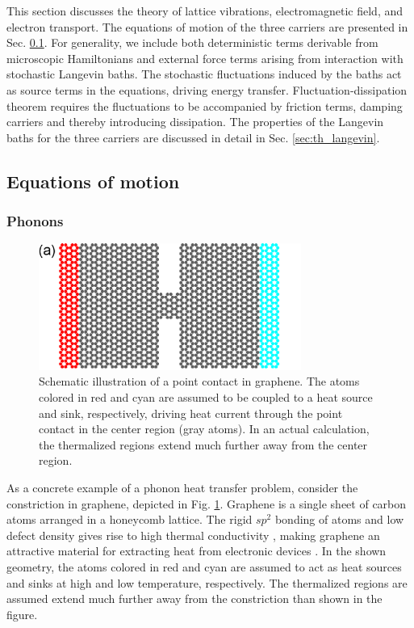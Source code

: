 This section discusses the theory of lattice vibrations, electromagnetic field, and electron transport. The equations of motion of the three carriers are presented in Sec. \ref{sec:th_eom}. For generality, we include both deterministic terms derivable from microscopic Hamiltonians and external force terms arising from interaction with stochastic Langevin baths. The stochastic fluctuations induced by the baths act as source terms in the equations, driving energy transfer. Fluctuation-dissipation theorem requires the fluctuations to be accompanied by friction terms, damping carriers and thereby introducing dissipation. The properties of the Langevin baths for the three carriers are discussed in detail in Sec. \ref{sec:th_langevin}.  

\subsection{Equations of motion}
\label{sec:th_eom}

\subsubsection{Phonons}

\label{sec:th_phonons}

\begin{figure}
\begin{center}
 \includegraphics[width=8.6cm]{pics/gf_fig8a_2.pdf}
 \caption{Schematic illustration of a point contact in graphene. The atoms colored in red and cyan are assumed to be coupled to a heat source and sink, respectively, driving heat current through the point contact in the center region (gray atoms). In an actual calculation, the thermalized regions extend much further away from the center region.}
\label{fig:graphene_geom}
\end{center}
\end{figure} 

As a concrete example of a phonon heat transfer problem, consider the constriction in graphene, depicted in Fig. \ref{fig:graphene_geom}. Graphene is a single sheet of carbon atoms arranged in a honeycomb lattice. The rigid $sp^2$ bonding of atoms and low defect density gives rise to high thermal conductivity \cite{ghosh08,balandin11}, making graphene an attractive material for extracting heat from electronic devices \cite{yan12}. In the shown geometry, the atoms colored in red and cyan are assumed to act as heat sources and sinks at high and low temperature, respectively. The thermalized regions are assumed extend much further away from the constriction than shown in the figure. 

